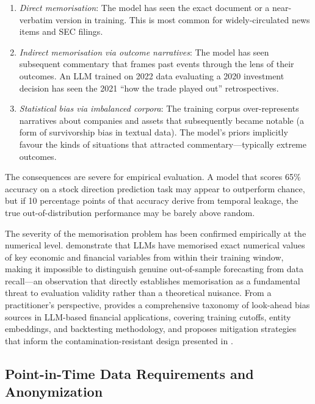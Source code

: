 \begin{enumerate}
  \item \emph{Direct memorisation}: The model has seen the exact document or a near-verbatim
        version in training. This is most common for widely-circulated news items and
        SEC filings.
  \item \emph{Indirect memorisation via outcome narratives}: The model has seen subsequent
        commentary that frames past events through the lens of their outcomes. An LLM
        trained on 2022 data evaluating a 2020 investment decision has seen the 2021
        ``how the trade played out'' retrospectives.
  \item \emph{Statistical bias via imbalanced corpora}: The training corpus
        over-represents narratives about companies and assets that subsequently became
        notable (a form of survivorship bias in textual data). The model's priors
        implicitly favour the kinds of situations that attracted commentary---typically
        extreme outcomes.
\end{enumerate}

The consequences are severe for empirical evaluation. A model that scores 65\% accuracy
on a stock direction prediction task may appear to outperform chance, but if 10
percentage points of that accuracy derive from temporal leakage, the true
out-of-distribution performance may be barely above random.

The severity of the memorisation problem has been confirmed empirically at the numerical
level. \citet{LopezLiraTangZhu2025} demonstrate that LLMs have memorised exact numerical
values of key economic and financial variables from within their training window, making
it impossible to distinguish genuine out-of-sample forecasting from data recall---an
observation that directly establishes memorisation as a fundamental threat to evaluation
validity rather than a theoretical nuisance. From a practitioner's perspective,
\citet{NoguerAlonso2024} provides a comprehensive taxonomy of look-ahead bias sources in
LLM-based financial applications, covering training cutoffs, entity embeddings, and
backtesting methodology, and proposes mitigation strategies that inform the contamination-resistant
design presented in .

\subsection{Point-in-Time Data Requirements and Anonymization}
\label{sec:ch13-point-in-time-data}


